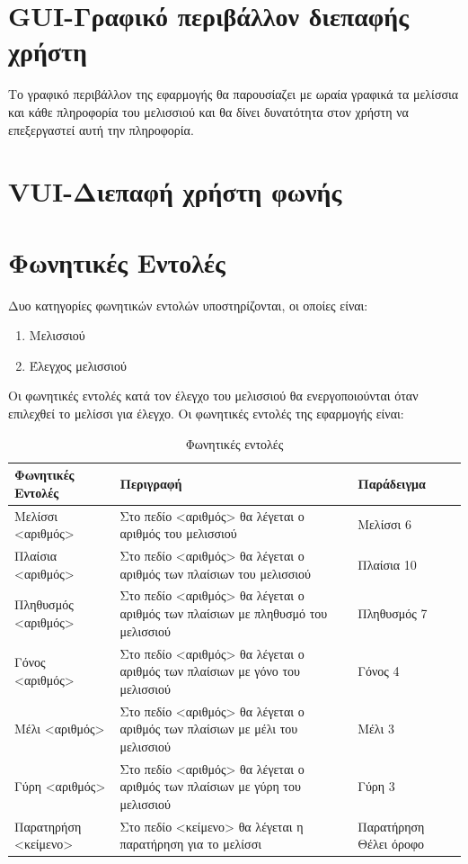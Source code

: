 \documentclass[oneside, 12pt]{book}
\begin{document}
\section{GUI-Γραφικό περιβάλλον διεπαφής χρήστη}
\label{sec:gui-γραφικό-περιβάλλον-χρήστη}
Το γραφικό περιβάλλον της εφαρμογής θα παρουσίαζει με ωραία γραφικά τα μελίσσια και κάθε πληροφορία του μελισσιού και θα δίνει δυνατότητα στον χρήστη να επεξεργαστεί αυτή την πληροφορία.
\section{VUI-Διεπαφή χρήστη φωνής}
\label{sec:vui---διεπαφή-χρήστη-φωνής}
\section{Φωνητικές Εντολές}
\label{sec:φωνητικές-εντολές}
Δυο κατηγορίες φωνητικών εντολών υποστηρίζονται, οι οποίες είναι:
\begin{enumerate}
  \item Μελισσιού
  \item Έλεγχος μελισσιού
\end{enumerate}
Οι φωνητικές εντολές κατά τον έλεγχο του μελισσιού θα ενεργοποιούνται όταν επιλεχθεί το μελίσσι για έλεγχο.
Οι φωνητικές εντολές της εφαρμογής είναι:
\begin{table}[h]
  \centering
  \caption{Φωνητικές εντολές}
  \begin{tabularx}{\linewidth}[h]{|X|X|X|}
    \hline
    Φωνητικές Εντολές & Περιγραφή & Παράδειγμα \\
    \hline
    \hline
    Μελίσσι <αριθμός> & Στο πεδίο <αριθμός> θα λέγεται ο αριθμός του μελισσιού & Μελίσσι 6 \\
    \hline
    Πλαίσια <αριθμός> & Στο πεδίο <αριθμός> θα λέγεται ο αριθμός των πλαίσιων του μελισσιού & Πλαίσια 10 \\
    \hline
    Πληθυσμός <αριθμός> & Στο πεδίο <αριθμός> θα λέγεται ο αριθμός των πλαίσιων με πληθυσμό του μελισσιού & Πληθυσμός 7 \\
    \hline
    Γόνος <αριθμός> & Στο πεδίο <αριθμός> θα λέγεται ο αριθμός των πλαίσιων με γόνο του μελισσιού & Γόνος 4 \\
    \hline
    Μέλι <αριθμός> & Στο πεδίο <αριθμός> θα λέγεται ο αριθμός των πλαίσιων με μέλι του μελισσιού & Μέλι 3 \\
    \hline
    Γύρη <αριθμός> & Στο πεδίο <αριθμός> θα λέγεται ο αριθμός των πλαίσιων με γύρη του μελισσιού & Γύρη 3 \\
    \hline
    Παρατηρήση <κείμενο> & Στο πεδίο <κείμενο> θα λέγεται η παρατήρηση για το μελίσσι & Παρατήρηση Θέλει όροφο  \\
    \hline
  \end{tabularx}
  \label{tab:table3}
\end{table}
\end{document}
